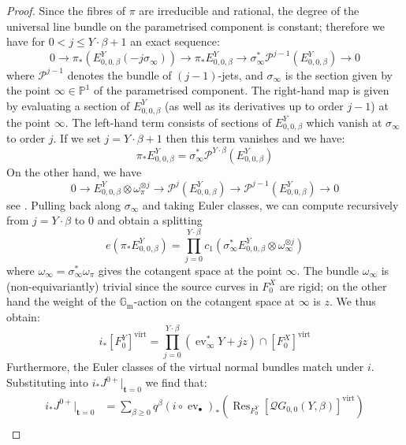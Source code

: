 \documentclass[10pt]{amsart}
\newcommand{\QG}[4]{\mathcal{Q}G_{#1,#2}(#3,#4)}
\newcommand{\PP}{\mathbb P}
\renewcommand{\to}{\rightarrow}
\newcommand{\Gm}{\mathbb{G}_{\text{m}}}
\newcommand{\virt}[1]{[#1]^{\operatorname{virt}}}
\newcommand{\ev}{\operatorname{ev}}
\theoremstyle{definition}
\theoremstyle{definition}
\begin{document}
\begin{proof}
Since the fibres of $\pi$ are irreducible and rational, the degree of the universal line bundle on the parametrised component is constant; therefore we have for $0 < j \leq Y\cdot\beta + 1$ an exact sequence:
\begin{equation*} 0 \to \pi_* (E^Y_{0,0,\beta}(-j\sigma_\infty)) \to \pi_* E^Y_{0,0,\beta} \to \sigma_\infty^*\mathcal{P}^{j-1}(E^Y_{0,0,\beta}) \to 0 \end{equation*}
where $\mathcal{P}^{j-1}$ denotes the bundle of $(j-1)$-jets, and $\sigma_{\infty}$ is the section given by the point $\infty \in \PP^1$ of the parametrised component. The right-hand map is given by evaluating a section of $E_{0,0,\beta}^Y$ (as well as its derivatives up to order $j-1$) at the point $\infty$. The left-hand term consists of sections of $E_{0,0,\beta}^Y$ which vanish at $\sigma_\infty$ to order $j$. If we set $j=Y\cdot\beta+1$ then this term vanishes and we have:
\begin{equation*} \pi_* E_{0,0,\beta}^Y = \sigma_\infty^* \mathcal{P}^{Y\cdot\beta}(E_{0,0,\beta}^Y) \end{equation*}
On the other hand, we have
\begin{equation*} 0 \to E^Y_{0,0,\beta} \otimes \omega_\pi^{\otimes j} \to \mathcal{P}^{j}(E^Y_{0,0,\beta}) \to \mathcal{P}^{j-1}(E^Y_{0,0,\beta}) \to 0
\end{equation*}
see \cite[\S 2]{Ga}. Pulling back along $\sigma_\infty$ and taking Euler classes, we can compute recursively from $j = Y \cdot \beta$ to $0$ and obtain a splitting
\begin{equation*}
e(\pi_* E^Y_{0,0,\beta})=\prod_{j=0}^{Y\cdot\beta} c_1(\sigma_\infty^* E^Y_{0,0,\beta}\otimes \omega_{\infty}^{\otimes j})
\end{equation*}
where $\omega_\infty=\sigma_\infty^*\omega_\pi$ gives the cotangent space at the point $\infty$. The bundle $\omega_\infty$ is (non-equivariantly) trivial since the source curves in $F_0^X$ are rigid; on the other hand the weight of the $\Gm$-action on the cotangent space at $\infty$ is $z$. We thus obtain:
\begin{equation*} i_*\virt{F_0^Y}=\prod_{j=0}^{Y\cdot\beta}(\ev_\infty^* Y+jz)\cap \virt{F_0^X} \end{equation*}
Furthermore, the Euler classes of the virtual normal bundles match under $i$. Substituting into $i_*J^{0+}|_{\mathbf{t}=0}$ we find that:
\begin{align*} i_* {J^{0+}}|_{{\mathbf{t}=0}} & = \sum_{\beta\geq 0}q^\beta(i\circ\ev_\bullet)_* \left( \operatorname{Res}_{F_0^Y}\virt{\QG{0}{0}{Y}{\beta}} \right) \\

\end{align*}
\end{proof}
\end{document}
